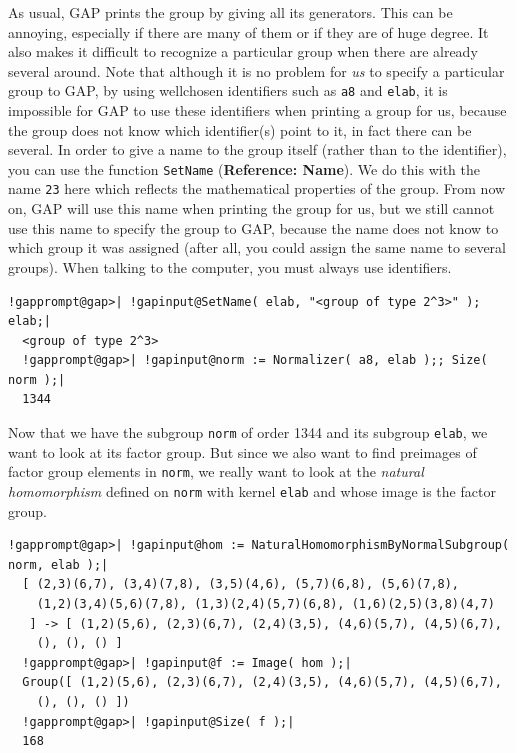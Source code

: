 \documentclass[a4paper,11pt]{report}
\begin{document}
{{ As usual, \textsf{GAP} prints the group by giving all its generators. This can be annoying,
especially if there are many of them or if they are of huge degree. It also
makes it difficult to recognize a particular group when there are already
several around. Note that although it is no problem for \emph{us} to specify a particular group to \textsf{GAP}, by using well\texttt{}chosen identifiers such as \texttt{a8} and \texttt{elab}, it is impossible for \textsf{GAP} to use these identifiers when printing a group for us, because the group does
not know which identifier(s) point to it, in fact there can be several. In
order to give a name to the group itself (rather than to the identifier), you
can use the function \texttt{SetName} (\textbf{Reference: Name}). We do this with the name \texttt{2\texttt{}3} here which reflects the mathematical properties of the group. From now on, \textsf{GAP} will use this name when printing the group for us, but we still cannot use
this name to specify the group to \textsf{GAP}, because the name does not know to which group it was assigned (after all,
you could assign the same name to several groups). When talking to the
computer, you must always use identifiers. 

 
\begin{Verbatim}[commandchars=!@|,fontsize=\small,frame=single,label=Example]
  !gapprompt@gap>| !gapinput@SetName( elab, "<group of type 2^3>" ); elab;|
  <group of type 2^3>
  !gapprompt@gap>| !gapinput@norm := Normalizer( a8, elab );; Size( norm );|
  1344
\end{Verbatim}
 

  Now that we have the subgroup \texttt{norm} of order 1344 and its subgroup \texttt{elab}, we want to look at its factor group. But since we also want to find
preimages of factor group elements in \texttt{norm}, we really want to look at the \emph{natural homomorphism} defined on \texttt{norm} with kernel \texttt{elab} and whose image is the factor group. 

 
\begin{Verbatim}[commandchars=!@|,fontsize=\small,frame=single,label=Example]
  !gapprompt@gap>| !gapinput@hom := NaturalHomomorphismByNormalSubgroup( norm, elab );|
  [ (2,3)(6,7), (3,4)(7,8), (3,5)(4,6), (5,7)(6,8), (5,6)(7,8),
    (1,2)(3,4)(5,6)(7,8), (1,3)(2,4)(5,7)(6,8), (1,6)(2,5)(3,8)(4,7)
   ] -> [ (1,2)(5,6), (2,3)(6,7), (2,4)(3,5), (4,6)(5,7), (4,5)(6,7),
    (), (), () ]
  !gapprompt@gap>| !gapinput@f := Image( hom );|
  Group([ (1,2)(5,6), (2,3)(6,7), (2,4)(3,5), (4,6)(5,7), (4,5)(6,7),
    (), (), () ])
  !gapprompt@gap>| !gapinput@Size( f );|
  168
\end{Verbatim}
 

}}
\end{document}
